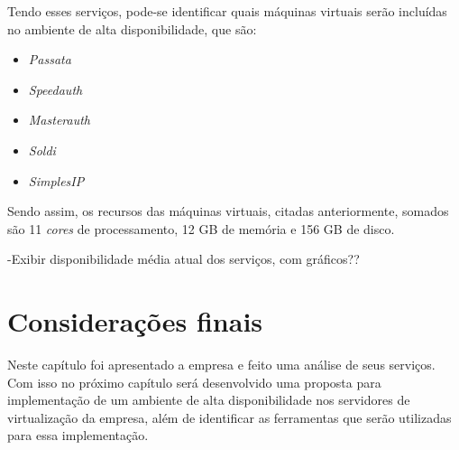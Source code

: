 Tendo esses serviços, pode-se identificar quais máquinas virtuais serão incluídas no ambiente de alta disponibilidade, que são:
\begin{itemize}
 \item \textit{Passata}
 \item \textit{Speedauth}
 \item \textit{Masterauth}
 \item \textit{Soldi}
 \item \textit{SimplesIP}
\end{itemize}

Sendo assim, os recursos das máquinas virtuais, citadas anteriormente, somados são 11 \textit{cores} de processamento, 12 GB de memória e 
156 GB de disco.

-Exibir disponibilidade média atual dos serviços, com gráficos??

\section{Considerações finais}

Neste capítulo foi apresentado a empresa e feito uma análise de seus serviços. Com isso no próximo capítulo será desenvolvido uma proposta 
para implementação de um ambiente de alta disponibilidade nos servidores de virtualização da empresa, além de identificar as ferramentas
que serão utilizadas para essa implementação.




